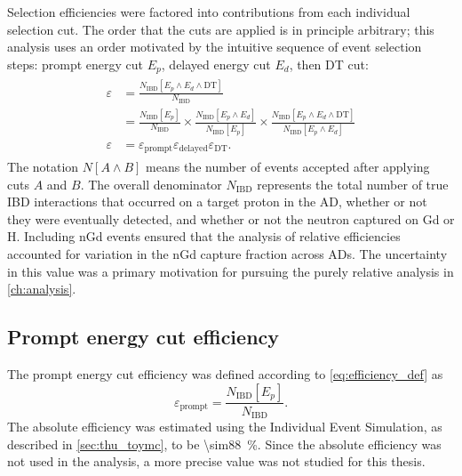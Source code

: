 Selection efficiencies were factored into
contributions from each individual selection cut.
The order that the cuts are applied is in principle arbitrary;
this analysis uses an order
motivated by the intuitive sequence of event selection steps:
prompt energy cut $E_p$, delayed energy cut $E_d$, then DT cut:
\begin{align}\label{eq:efficiency_def}
    \begin{split}
        \varepsilon &= \frac{N_\text{IBD}[E_p \wedge E_d \wedge \text{DT}]}{
            N_\text{IBD}
        } \\
                    &= \frac{N_\text{IBD}[E_p]}{N_\text{IBD}} \times
                    \frac{N_\text{IBD}[E_p \wedge E_d]}{
                        N_\text{IBD}[E_p]
                    } \times
                    \frac{N_\text{IBD}[E_p \wedge E_d \wedge \text{DT}]}{
                        N_\text{IBD}[E_p \wedge E_d]
                    } \\
        \varepsilon &= \varepsilon_\text{prompt}\varepsilon_\text{delayed}
        \varepsilon_\text{DT}.
    \end{split}
\end{align}
The notation $N[A \wedge B]$ means
the number of events accepted after applying cuts $A$ and $B$.
The overall denominator $N_\text{IBD}$
represents the total number of true IBD interactions
that occurred on a target proton in the AD,
whether or not they were eventually detected,
and whether or not the neutron captured on Gd or H.
Including nGd events ensured that the analysis of relative efficiencies
accounted for variation in the nGd capture fraction across ADs.
The uncertainty in this value was a primary motivation
for pursuing the purely relative analysis in \cref{ch:analysis}.

\subsection{Prompt energy cut efficiency}
\label{subsec:eff_prompt}

The prompt energy cut efficiency was defined
according to \cref{eq:efficiency_def} as
\begin{equation}\label{eq:prompt_eff}
    \varepsilon_\text{prompt} = \frac{N_\text{IBD}[E_p]}{N_\text{IBD}}.
\end{equation}
The absolute efficiency was estimated using the Individual Event Simulation,
as described in \cref{sec:thu_toymc}, to be \SI{\sim88}{\percent}.
Since the absolute efficiency was not used in the \thetaot{} analysis,
a more precise value was not studied for this thesis.

